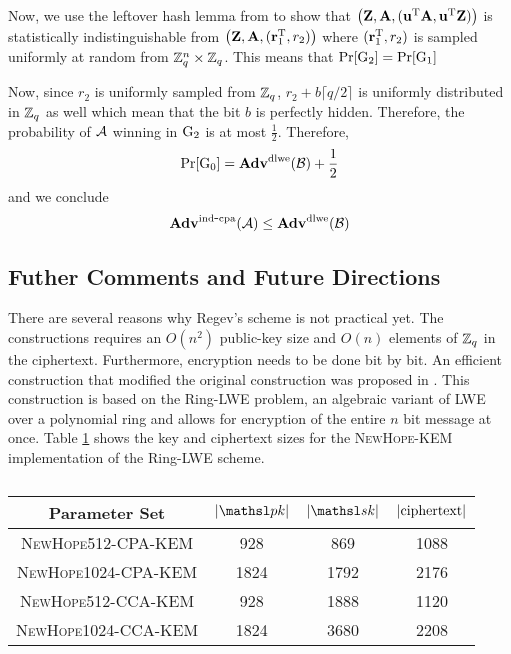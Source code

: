 \noindent Now, we use the leftover hash lemma from to show that $\left( \mathbf{Z}, \mathbf{A}, (\mathbf{u}^{\textnormal{T}}\mathbf{A}, \mathbf{u}^{\textnormal{T}}\mathbf{Z}) \right)$ is statistically indistinguishable from $\left(\mathbf{Z}, \mathbf{A}, (\mathbf{r}_1^{\textnormal{T}}, r_2) \right)$ where $(\mathbf{r}_1^{\textnormal{T}}, r_2)$ is sampled uniformly at random from ${{\mathbb Z}}_q^n \times {{\mathbb Z}}_q$. This means that $\Pr[{{\textnormal G}}_2] = \Pr[{{\textnormal G}}_1]$

\noindent Now, since $r_2$ is uniformly sampled from ${{\mathbb Z}}_q$, $r_2 + b \lceil q/2 \rceil$ is uniformly distributed in ${{\mathbb Z}}_q$ as well which mean that the bit $b$ is perfectly hidden. Therefore, the probability of ${\mathcal A}$ winning in ${{\textnormal G}}_2$ is at most $\frac{1}{2}$. Therefore,
\[
    \Pr[{{\textnormal G}}_0] = \mathbf{Adv}^{\textnormal{dlwe}}({\mathcal B}) + \frac{1}{2}
\]
and we conclude
\[
    \mathbf{Adv}^{\mathrm{ind\mbox{-} cpa}}_{}({\mathcal A}) \leq \mathbf{Adv}^{\textnormal{dlwe}}({\mathcal B})
\]


\subsection{Futher Comments and Future Directions}
There are several reasons why Regev's scheme is not practical yet. The constructions requires an $O(n^2)$ public-key size and $O(n)$ elements of ${{\mathbb Z}}_q$ in the ciphertext. Furthermore, encryption needs to be done bit by bit. An efficient construction that modified the original construction was proposed in \cite{Lyubashevsky2010}. This construction is based on the Ring-LWE problem, an algebraic variant of LWE over a polynomial ring and allows for encryption of the entire $n$ bit message at once. Table \ref{table:LWE Table} shows the key and ciphertext sizes for the \textsc{NewHope-KEM} implementation of the Ring-LWE scheme.

\begin{table}[h]
    \centering
    \begin{tabular}{|c|c|c|c|}
    \hline
    Parameter Set & $\abs{\pk}$ & $\abs{\sk}$ & ${\displaystyle \left| {\textnormal{ciphertext}} \right| }$\\
    \hline
    \hline
    \textsc{NewHope512-CPA-KEM} & 928 & 869 & 1088\\
    \hline
    \textsc{NewHope1024-CPA-KEM} & 1824 & 1792 & 2176\\
    \hline
    \scshape{NewHope512-CCA-KEM} & 928 & 1888 & 1120\\
    \hline
    \scshape{NewHope1024-CCA-KEM} & 1824 & 3680 & 2208\\
    \hline
    \end{tabular}
    \caption{}
    \label{table:LWE Table}
\end{table}

